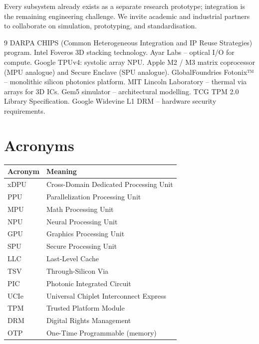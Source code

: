 \documentclass[10pt,twocolumn]{article}
\begin{document}
Every subsystem already exists as a separate research prototype; integration is the remaining engineering challenge. We invite academic and industrial partners to collaborate on simulation, prototyping, and standardisation.

\begin{thebibliography}{9}
 DARPA CHIPS (Common Heterogeneous Integration and IP Reuse Strategies) program.
 Intel Foveros 3D stacking technology.
 Ayar Labs – optical I/O for compute.
 Google TPUv4: systolic array NPU.
 Apple M2 / M3 matrix coprocessor (MPU analogue) and Secure Enclave (SPU analogue).
 GlobalFoundries Fotonix™ – monolithic silicon photonics platform.
 MIT Lincoln Laboratory – thermal via arrays for 3D ICs.
 Gem5 simulator – architectural modelling.
 TCG TPM 2.0 Library Specification.
 Google Widevine L1 DRM – hardware security requirements.
\end{thebibliography}

\appendix
\section{Acronyms}

\begin{table}[ht]
\centering
\begin{tabular}{@{}ll@{}}
\toprule
\textbf{Acronym} & \textbf{Meaning} \\
\midrule
xDPU & Cross-Domain Dedicated Processing Unit \\
PPU  & Parallelization Processing Unit \\
MPU  & Math Processing Unit \\
NPU  & Neural Processing Unit \\
GPU  & Graphics Processing Unit \\
SPU  & Secure Processing Unit \\
LLC  & Last-Level Cache \\
TSV  & Through-Silicon Via \\
PIC  & Photonic Integrated Circuit \\
UCIe & Universal Chiplet Interconnect Express \\
TPM  & Trusted Platform Module \\
DRM  & Digital Rights Management \\
OTP  & One-Time Programmable (memory) \\
\bottomrule
\end{tabular}
\end{table}
\end{document}
